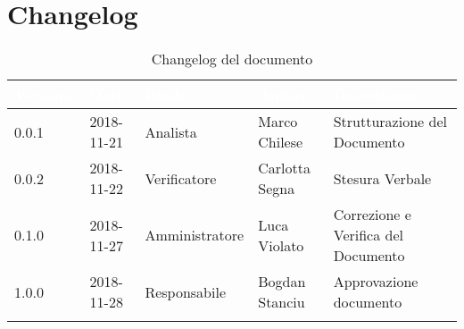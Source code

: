 \newpage

\section{Changelog}

\begin{center}
\begin{longtable}[c]{|m{}|m{}|m{}|m{}|p{}|}
\hline
\rowcolor{bluelogo}\textbf{\textcolor{white}{Versione}} & \textbf{\textcolor{white}{Data}} & \textbf{\textcolor{white}{Ruolo}} & \textbf{\textcolor{white}{Autore}} & \textbf{\textcolor{white}{Descrizione}}\\
\hline \hline
\endfirsthead
0.0.1 & 2018-11-21 & Analista & Marco Chilese & Strutturazione del Documento \\
\rowcolor{grigio} 0.0.2 & 2018-11-22 & Verificatore &Carlotta Segna  & Stesura Verbale \\
\hline
0.1.0 & 2018-11-27 & Amministratore &Luca Violato & Correzione e Verifica del Documento\\
\hline
\rowcolor{grigio} 1.0.0 & 2018-11-28 & Responsabile  & Bogdan Stanciu & Approvazione documento\\
\hline
\caption{Changelog del documento}
\end{longtable}
\end{center}
